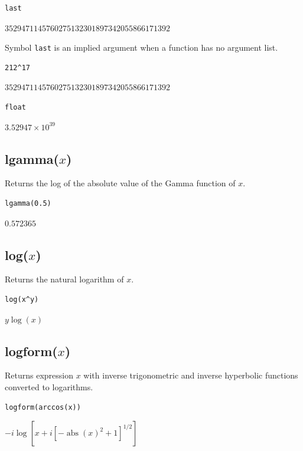 {\color{blue}
\begin{verbatim}
last
\end{verbatim}
}

$3529471145760275132301897342055866171392$

\bigskip
Symbol \verb$last$ is an implied argument when a function has no argument list.

{\color{blue}
\begin{verbatim}
212^17
\end{verbatim}
}

$3529471145760275132301897342055866171392$

{\color{blue}
\begin{verbatim}
float
\end{verbatim}
}

$\displaystyle 3.52947\times10^{39}$

\subsection*{lgamma($x$)}

Returns the log of the absolute value of the Gamma function of $x$.

{\color{blue}
\begin{verbatim}
lgamma(0.5)
\end{verbatim}
}

$0.572365$

\subsection*{log($x$)}

Returns the natural logarithm of $x$.

{\color{blue}
\begin{verbatim}
log(x^y)
\end{verbatim}
}

$y\log(x)$

\subsection*{logform($x$)}

Returns expression $x$ with inverse trigonometric and
inverse hyperbolic functions converted to logarithms.

{\color{blue}
\begin{verbatim}
logform(arccos(x))
\end{verbatim}
}

$\displaystyle
-i\log\left[x+i\left[-\operatorname{abs}(x)^2+1\right]^{1/2}\right]
$

